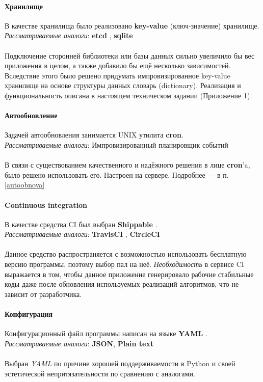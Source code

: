 \paragraph{Хранилище}\label{hraaan}
В качестве хранилища было реализовано \textbf{key-value} (ключ-значение) хранилище.\\
\emph{Рассматриваемые аналоги}: \textbf{etcd} \cite{etcd}, \textbf{sqlite} \cite{sqlite}\\\\
Подключение сторонней библиотеки или базы данных сильно увеличило бы вес
приложения в целом, а также добавило бы ещё несколько зависимостей. Вследствие
этого было решено придумать импровизированное key-value хранилище на основе
структуры данных словарь (dictionary).
Реализация и функциональность описана в настоящем техническом задании
(Приложение 1).

\paragraph{Автообновление}
Задачей автообновления занимается UNIX утилита \textbf{cron}.\\
\emph{Рассматриваемые аналоги}: Импровизированный планировщик событий\\\\
В связи с существованием качественного и надёжного решения в лице
\textbf{cron}'a, было решено использовать его. Настроен на сервере. Подробнее
--- в п. \ref{autoobnova}

\paragraph{Continuous integration}
В качестве средства CI был выбран \textbf{Shippable} \cite{shippable}.\\
\emph{Рассматриваемые аналоги}: \textbf{TravisCI} \cite{travisci}, \textbf{CircleCI} \cite{circleci}\\\\
Данное средство распространяется с возможностью использовать бесплатную версию
программы, поэтому выбор пал на неё. \emph{Необходимость} в сервисе CI
выражается в том, чтобы данное приложение генерировало рабочие стабильные коды
даже после обновления используемых реализаций алгоритмов, что не зависит от
разработчика.

\paragraph{Конфигурация}
Конфигурационный файл программы написан на языке \textbf{YAML} \cite{yaml}.\\
\emph{Рассматриваемые аналоги}: \textbf{JSON}, \textbf{Plain text}\\\\
Выбран \emph{YAML} по причине хорошей поддерживаемости в Python и своей эстетической
непритязательности по сравнению с аналогами.


